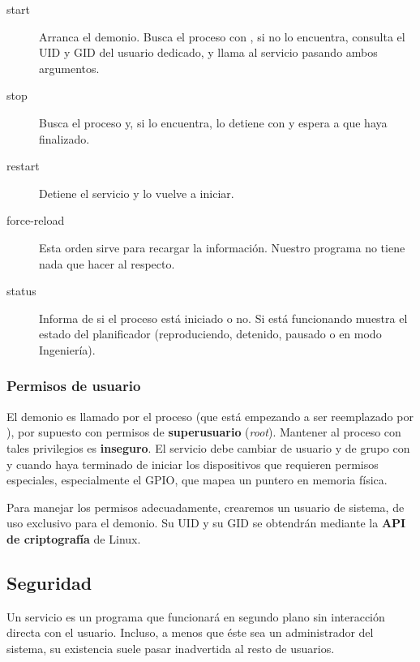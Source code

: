 \begin{description}
	\item[start] Arranca el demonio. Busca el proceso con , si no lo encuentra, consulta el \acrshort{UID} y \acrshort{GID} del usuario dedicado, y llama al servicio pasando ambos argumentos.
	
	\item[stop] Busca el proceso y, si lo encuentra, lo detiene con  y espera a que haya finalizado.
	
	\item[restart] Detiene el servicio y lo vuelve a iniciar.
	
	\item[force-reload] Esta orden sirve para recargar la información. Nuestro programa no tiene nada que hacer al respecto.
	
	\item[status] Informa de si el proceso está iniciado o no. Si está funcionando muestra el estado del planificador (reproduciendo, detenido, pausado o en modo Ingeniería).
\end{description}

\subsubsection{Permisos de usuario}

El demonio es llamado por el proceso  (que está empezando a ser reemplazado por ), por supuesto con permisos de \textbf{superusuario} (\textit{root}). Mantener al proceso con tales privilegios es \textbf{inseguro}. El servicio debe cambiar de usuario y de grupo con  y  cuando haya terminado de iniciar los dispositivos que requieren permisos especiales, especialmente el \acrshort{GPIO}, que mapea un puntero en memoria física.

Para manejar los permisos adecuadamente, crearemos un usuario de sistema, de uso exclusivo para el demonio. Su \acrshort{UID} y su \acrshort{GID} se obtendrán mediante la \textbf{\acrshort{API} de criptografía} de Linux.

\subsection{Seguridad}
\label{subsec:seg_demonio}

Un servicio es un programa que funcionará en segundo plano sin interacción directa con el usuario. Incluso, a menos que éste sea un administrador del sistema, su existencia suele pasar inadvertida al resto de usuarios.

